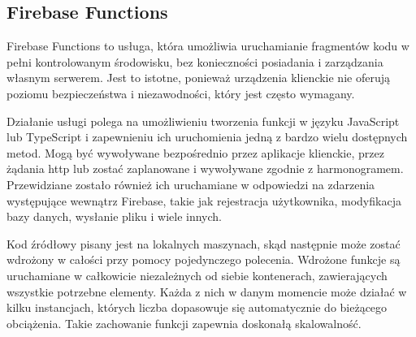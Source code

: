 \subsection{Firebase Functions}
\label{technologie-functions}

Firebase Functions to usługa, która umożliwia uruchamianie fragmentów kodu w pełni kontrolowanym środowisku, bez konieczności posiadania i zarządzania własnym serwerem. Jest to istotne, ponieważ urządzenia klienckie nie oferują poziomu bezpieczeństwa i niezawodności, który jest często wymagany.


Działanie usługi polega na umożliwieniu tworzenia funkcji w języku \mbox{JavaScript} lub \mbox{TypeScript} i zapewnieniu ich uruchomienia jedną z bardzo wielu dostępnych metod. Mogą być wywoływane bezpośrednio przez aplikacje klienckie, przez żądania http lub zostać zaplanowane i wywoływane zgodnie z harmonogramem. Przewidziane zostało również ich uruchamiane w odpowiedzi na zdarzenia występujące wewnątrz Firebase, takie jak rejestracja użytkownika, modyfikacja bazy danych, wysłanie pliku i wiele innych.

Kod źródłowy pisany jest na lokalnych maszynach, skąd następnie może zostać wdrożony w całości przy pomocy pojedynczego polecenia. Wdrożone funkcje są uruchamiane w całkowicie niezależnych od siebie kontenerach, zawierających wszystkie potrzebne elementy. Każda z nich w danym momencie może działać w kilku instancjach, których liczba dopasowuje się automatycznie do bieżącego obciążenia. Takie zachowanie funkcji zapewnia doskonałą skalowalność.



